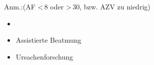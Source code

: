 \label{m:atmung-insuffizient}
Anm.:(AF \textless\,8 oder \textgreater\,30\PerMin*, bzw. AZV zu niedrig)

\begin{itemize}
  \item \TxMassVitMK
  \item Assistierte Beatmung
  \item Ursachenforschung
\end{itemize}